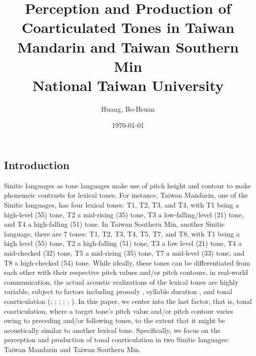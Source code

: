 \documentclass[12pt]{report}
\title{
{Perception and Production of Coarticulated Tones in Taiwan Mandarin and Taiwan Southern Min}\\
{\large National Taiwan University}
}
\author{Huang, Bo-Hsuan}
\date{\today}
\begin{document}
\sloppy
\let\newpage\relax\maketitle
\large
\noautomath
\begin{CJK}{UTF8}{bsmi}


\chapter{Introduction}\label{chapter:Introduction}

Sinitic languages as tone languages make use of pitch height and contour to make phonemeic contrasts for lexical tones. For instance, Taiwan Mandarin, one of the Sinitic languages, has four lexical tones: T1, T2, T3, and T4, with T1 being a high-level (55) tone, T2 a mid-rising (35) tone, T3 a low-falling/level (21) tone, and T4 a high-falling (51) tone. In Taiwan Southern Min, another Sinitic language, there are 7 tones: T1, T2, T3, T4, T5, T7, and T8, with T1 being a high level (55) tone, T2 a high-falling (51) tone, T3 a low level (21) tone, T4 a mid-checked (32) tone, T5 a mid-rising (35) tone, T7 a mid-level (33) tone, and T8 a high-checked (54) tone. While ideally, these tones can be differentiated from each other with their respective pitch values and/or pitch contours, in real-world communication, the actual acoustic realizations of the lexical tones are highly variable, subject to factors including prosody \citep{Peng1997}, syllable duration \citep{XuWang2009}, and tonal coarticulation (\citealp{Shen1990}; \citealp{Xu1994}; \citealp{Peng1997}; \citeyear{Xu1997}; \citealp{Wang2002}; \citealp{ChangHsieh2012}). In this paper, we center into the last factor, that is, tonal coarticulation, where a target tone's pitch value and/or pitch contour varies owing to preceding and/or following tones, to the extent that it might be acoustically similar to another lexical tone. Specifically, we focus on the perception and production of tonal coarticulation in two Sinitic languages: Taiwan Mandarin and Taiwan Southern Min.



\end{CJK}
\end{document}
